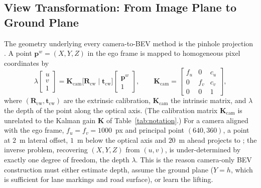 \subsection{View Transformation: From Image Plane to Ground Plane}
\label{subsec:view-transformation}
The geometry underlying every camera-to-BEV method is the pinhole projection \cite{hartley2003_mvg}. A point $\mathbf{p}^{w}=(X,Y,Z)$ in the ego frame is mapped to homogeneous pixel coordinates by
\begin{equation}
\lambda\begin{bmatrix}u\\ v\\ 1\end{bmatrix}
=\mathbf{K}_{\mathrm{cam}}\big[\mathbf{R}_{\mathrm{cw}}\;|\;\mathbf{t}_{\mathrm{cw}}\big]
\begin{bmatrix}\mathbf{p}^{w}\\ 1\end{bmatrix},\qquad
\mathbf{K}_{\mathrm{cam}}=\begin{bmatrix}f_u & 0 & c_u\\ 0 & f_v & c_v\\ 0&0&1\end{bmatrix},
\label{eq:pinhole}
\end{equation}
where $(\mathbf{R}_{\mathrm{cw}},\mathbf{t}_{\mathrm{cw}})$ are the extrinsic calibration, $\mathbf{K}_{\mathrm{cam}}$ the intrinsic matrix, and $\lambda$ the depth of the point along the optical axis. (The calibration matrix $\mathbf{K}_{\mathrm{cam}}$ is unrelated to the Kalman gain $\mathbf{K}$ of Table~\ref{tab:notation}.) For a camera aligned with the ego frame, $f_u=f_v=1000$~px and principal point $(640,360)$, a point at $2$~m lateral offset, $1$~m below the optical axis and $20$~m ahead projects to ; the inverse problem, recovering $(X,Y,Z)$ from $(u,v)$, is under-determined by exactly one degree of freedom, the depth $\lambda$. This is the reason camera-only BEV construction must either estimate depth, assume the ground plane ($Y=h$, which is sufficient for lane markings and road surface), or learn the lifting.

